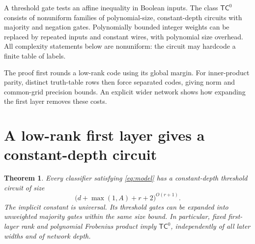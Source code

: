 \documentclass[11pt]{article}
\newtheorem{theorem}{Theorem}[section]
\theoremstyle{remark}\newtheorem{remark}[theorem]{Remark}
\newcommand{\TC}{\mathsf{TC}}
\begin{document}
A threshold gate tests an affine inequality in Boolean inputs. The class
$\TC^0$ consists of nonuniform families of polynomial-size, constant-depth
circuits with majority and negation gates. Polynomially bounded integer
weights can be replaced by repeated inputs and constant wires, with
polynomial size overhead. All complexity statements below are nonuniform:
the circuit may hardcode a finite table of labels.

The proof first rounds a low-rank code using its global margin. For
inner-product parity, distinct truth-table rows then force separated codes,
giving norm and common-grid precision bounds. An explicit wider network
shows how expanding the first layer removes these costs.

\section{A low-rank first layer gives a constant-depth circuit}
\begin{theorem}\label{thm:rank}
Every classifier satisfying \eqref{eq:model} has a constant-depth
threshold circuit of size
\begin{equation}\label{eq:size}
 \bigl(d+\max(1,A)+r+2\bigr)^{O(r+1)}.
\end{equation}
The implicit constant is universal. Its threshold gates can be expanded
into unweighted majority gates within the same size bound. In particular,
fixed first-layer rank and polynomial Frobenius product imply $\TC^0$,
independently of all later widths and of network depth.
\end{theorem}
\end{document}
